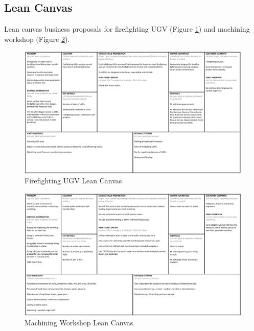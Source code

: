 \documentclass[11pt, a4, nocenter, margin=150mm]{article}
\begin{document}
\begin{appendices}

\section{Lean Canvas}
\label{app:lean_canvas}
	
	Lean canvas business proposals for firefighting UGV (Figure \ref{fig:ugv_lean_canvas}) and machining workshop (Figure \ref{fig:workshop_lean_canvas}).

	\begin{figure}[h!]
		\centering
		\includegraphics[width=\textwidth]{week2/lean_canvas_ugv.png}
		\caption{Firefighting UGV Lean Canvas}
		\label{fig:ugv_lean_canvas}
	\end{figure}

	\begin{figure}[h!]
		\centering
		\includegraphics[width=\textwidth]{week2/lean_canvas_workshop.png}
		\caption{Machining Workshop Lean Canvas}
		\label{fig:workshop_lean_canvas}
	\end{figure}


\end{appendices}
\end{document}
